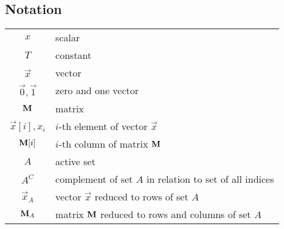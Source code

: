 \subsection*{Notation}
\begin{tabular}{c l}
$x$ & scalar\\
$T$ & constant\\
$\vec{x}$ & vector\\
$\vec{0},\vec{1}$ & zero and one vector\\
$\boldsymbol{\mathrm{M}}$ & matrix\\
$\vec{x}[i],x_i$ & $i$-th element of vector $\vec{x}$\\
$\boldsymbol{\mathrm{M}}[i]$ & $i$-th column of matrix $\boldsymbol{\mathrm{M}}$\\
$A$ & active set\\
$A^C$ & complement of set $A$ in relation to set of all indices\\ 
$\vec{x}_A$ & vector $\vec{x}$ reduced to rows of set $A$ \\
$\boldsymbol{\mathrm{M}}_A$ & matrix $\boldsymbol{\mathrm{M}}$ reduced to rows and columns of set $A$ \\
\end{tabular}



